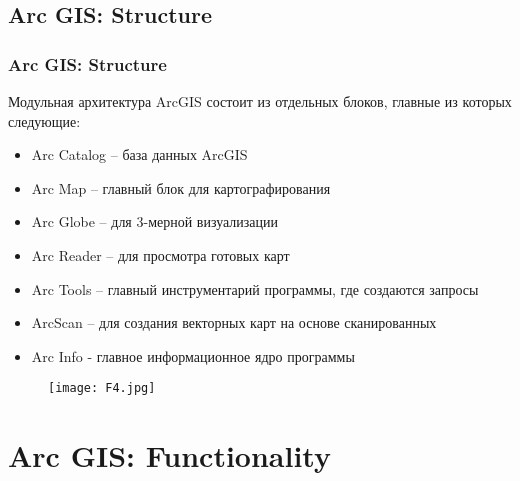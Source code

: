 \documentclass[pdflatex,compress,8pt,
	xcolor={dvipsnames,dvipsnames,svgnames,x11names,table},
	hyperref={	 
	pdfauthor={Lemenkova Polina}, 
	pdfsubject={Preentation}, 
	pdfcreator={Lemenkova Polina}, 
	pdfproducer={Lemenkova Polina}, 
	colorlinks=true,
	linkcolor=Red3, 
	citecolor=NavyBlue, 
	urlcolor = NavyBlue, 
	breaklinks = true}]{beamer}
\begin{document}
\subsection{Arc GIS: Structure}
\begin{frame}\frametitle{Arc GIS: Structure}
Модульная архитектура ArcGIS состоит из отдельных блоков, главные из которых следующие:
\begin{itemize}
	\item Arc Catalog – база данных ArcGIS
	\item Arc Map – главный блок для картографирования
	\item Arc Globe – для 3-мерной визуализации
	\item Arc Reader – для просмотра готовых карт
	\item Arc Tools – главный инструментарий программы, где создаются запросы
	\item ArcScan – для создания векторных карт на основе сканированных
	\item Arc Info - главное информационное ядро программы
\end{itemize}
\begin{figure}[H]
	\centering
		\texttt{[image: F4.jpg]}
\end{figure}

\end{frame}

\section{Arc GIS: Functionality}
\end{document}
